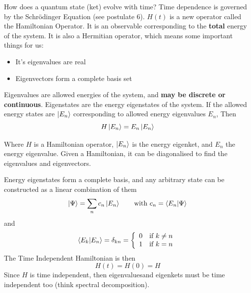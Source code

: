 \documentclass[english, 11pt]{article}
\begin{document}
    How does a quantum state (ket) evolve with time? Time dependence is governed by the Schrödinger Equation (see postulate 6). $H(t)$ is a new operator called the Hamiltonian Operator.
    It is an observable corresponding to the \textbf{total} energy of the system. It is also a Hermitian operator, which means some important things for us:
    \begin{itemize}
      \item It's eigenvalues are real
      \item Eigenvectors form a complete basis set
    \end{itemize}
    Eigenvalues are allowed energies of the system, and \textbf{may be discrete or continuous}. Eigenstates are the energy eigenstates of the system. If the allowed energy states are $\left|E_n\right\rangle$ corresponding to allowed energy eigenvalues $E_n$, Then
    \[ H\left|E_n\right\rangle = E_n\left|E_n\right\rangle \]

    Where $H$ is a Hamiltonian operator, $\left|E_n\right\rangle$ is the energy eigenket, and $E_n$ the energy eigenvalue. Given a Hamiltonian, it can be diagonalised to find the eigenvalues and eigenvectors.
    \newline

    Energy eigenstates form a complete basis, and any arbitrary state can be constructed as a linear combination of them
    \[ \ket{\Psi} = \sum_n c_n\ket{E_n} \mbox{ \ \ \ \ \ with } c_n = \braket{E_n}{\Psi} \]
    and
    \[ \braket{E_k}{E_n} = \delta_{kn} = \piecewise{0}{if $k \not = n$}{1}{if $k = n$} \]
    The Time Independent Hamiltonian is then
    \[ H(t) = H(0) = H \]
    Since $H$ is time independent, then eigenvaluesand eigenkets must be time independent too (think spectral decomposition).
    \newline
\end{document}

